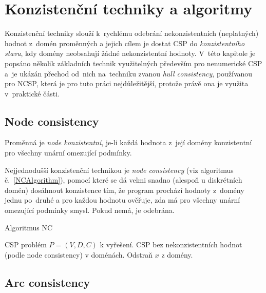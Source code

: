 \section{Konzistenční techniky a algoritmy}
Konzistenční techniky slouží k~rychlému odebrání nekonzistentních (neplatných) hodnot z~domén proměnných a jejich cílem je dostat CSP do \emph{konzistentního stavu}, kdy domény neobsahují žádné nekonzistentní hodnoty. V~této kapitole je popsáno několik základních technik využitelných především pro nenumerické CSP a~je ukázán přechod od~nich na~techniku zvanou \emph{hull consistency}, používanou pro NCSP, která je pro tuto práci nejdůležitější, protože právě ona je využita v~praktické části.

\subsection{Node consistency}

\begin{definition}
\label{def:nodeConsistency}
Proměnná je \emph{node konzistentní}, je-li každá hodnota z~její domény konzistentní pro všechny unární omezující podmínky.
\end{definition}

Nejjednodušší konzistenční technikou je \emph{node consistency} \cite{bartakGuide} (viz algoritmus č.~\ref{NCAlgorithm}), pomocí které se dá velmi snadno (alespoň u diskrétních domén) dosáhnout konzistence tím, že program prochází hodnoty z~domény jednu po~druhé a pro každou hodnotu ověřuje, zda má pro všechny unární omezující podmínky smysl. Pokud nemá, je odebrána.


\begin{algorithm}
\caption{Algoritmus NC}
\label{NCAlgorithm}
\begin{algorithmic}[1]
\Require CSP problém $P = (V, D, C)$ k vyřešení.
\Ensure CSP bez nekonzistentních hodnot (podle node consistency) v doménách.
\State Odstraň $x$ z domény.
\EndIf
\EndFor
\EndFor
\EndFor
\EndProcedure
\end{algorithmic}
\end{algorithm}


\subsection{Arc consistency}

